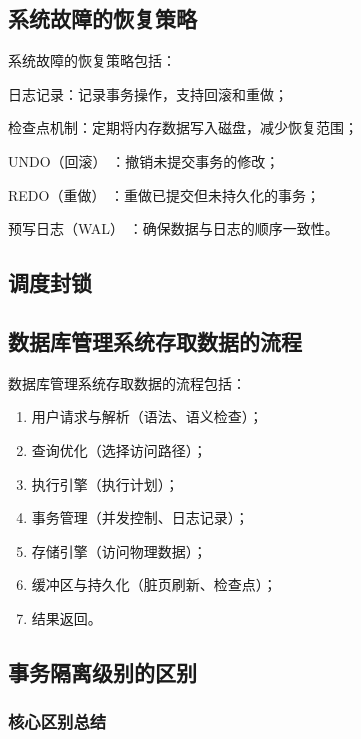 \documentclass[a4paper,12pt,UTF8,fontset=none]{ctexart}
\begin{document}
\subsection{系统故障的恢复策略}
系统故障的恢复策略包括：

日志记录：记录事务操作，支持回滚和重做；

检查点机制：定期将内存数据写入磁盘，减少恢复范围；

UNDO（回滚） ：撤销未提交事务的修改；

REDO（重做） ：重做已提交但未持久化的事务；

预写日志（WAL） ：确保数据与日志的顺序一致性。
\subsection{调度封锁}
\subsection{数据库管理系统存取数据的流程}
数据库管理系统存取数据的流程包括：

\begin{enumerate}
    \item 用户请求与解析（语法、语义检查）；
    \item 查询优化（选择访问路径）；
    \item 执行引擎（执行计划）；
    \item 事务管理（并发控制、日志记录）；
    \item 存储引擎（访问物理数据）；
    \item 缓冲区与持久化（脏页刷新、检查点）；
    \item 结果返回。
\end{enumerate}
\subsection{事务隔离级别的区别}
\subsubsection{核心区别总结}
\end{document}
